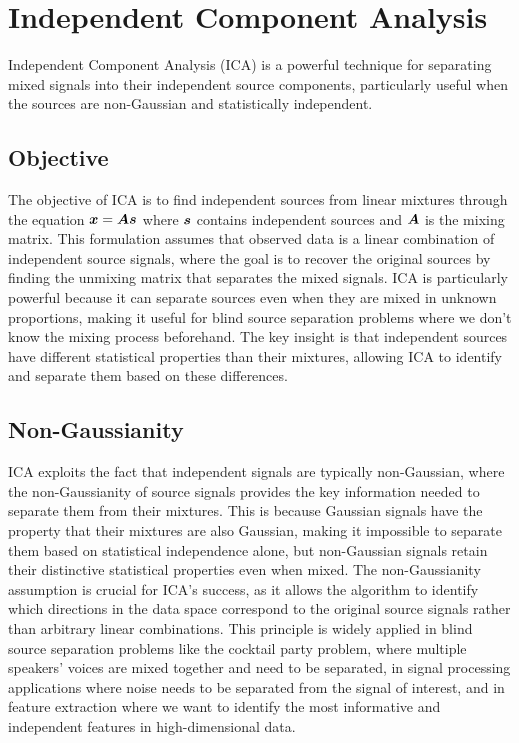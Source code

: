
\section{Independent Component Analysis }
\label{sec:ica}

Independent Component Analysis (ICA) is a powerful technique for separating mixed signals into their independent source components, particularly useful when the sources are non-Gaussian and statistically independent.

\subsection{Objective}

The objective of ICA is to find independent sources from linear mixtures through the equation $\boldsymbol{x} = \boldsymbol{A}\boldsymbol{s}$ where $\boldsymbol{s}$ contains independent sources and $\boldsymbol{A}$ is the mixing matrix. This formulation assumes that observed data is a linear combination of independent source signals, where the goal is to recover the original sources by finding the unmixing matrix that separates the mixed signals. ICA is particularly powerful because it can separate sources even when they are mixed in unknown proportions, making it useful for blind source separation problems where we don't know the mixing process beforehand. The key insight is that independent sources have different statistical properties than their mixtures, allowing ICA to identify and separate them based on these differences.

\subsection{Non-Gaussianity}

ICA exploits the fact that independent signals are typically non-Gaussian, where the non-Gaussianity of source signals provides the key information needed to separate them from their mixtures. This is because Gaussian signals have the property that their mixtures are also Gaussian, making it impossible to separate them based on statistical independence alone, but non-Gaussian signals retain their distinctive statistical properties even when mixed. The non-Gaussianity assumption is crucial for ICA's success, as it allows the algorithm to identify which directions in the data space correspond to the original source signals rather than arbitrary linear combinations. This principle is widely applied in blind source separation problems like the cocktail party problem, where multiple speakers' voices are mixed together and need to be separated, in signal processing applications where noise needs to be separated from the signal of interest, and in feature extraction where we want to identify the most informative and independent features in high-dimensional data.

